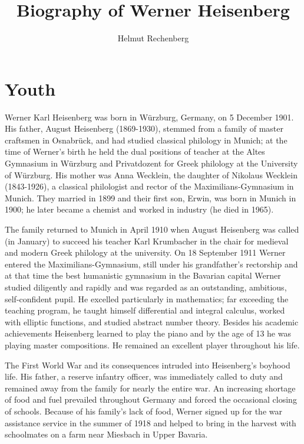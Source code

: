 \documentclass{article}
\title{Biography of Werner Heisenberg}
\author{Helmut Rechenberg}
\date{}
\begin{document}
\maketitle

\tableofcontents

\section{Youth}

Werner Karl Heisenberg was born in Würzburg, Germany, on 5 December 1901. His father, August Heisenberg (1869-1930), stemmed from a family of master craftsmen in Osnabrück, and had studied classical philology in Munich; at the time of Werner's birth he held the dual positions of teacher at the Altes Gymnasium in Würzburg and Privatdozent for Greek philology at the University of Würzburg. His mother was Anna Wecklein, the daughter of Nikolaus Wecklein (1843-1926), a classical philologist and rector of the Maximilians-Gymnasium in Munich. They married in 1899 and their first son, Erwin, was born in Munich in 1900; he later became a chemist and worked in industry (he died in 1965).

The family returned to Munich in April 1910 when August Heisenberg was called (in January) to succeed his teacher Karl Krumbacher in the chair for medieval and modern Greek philology at the university. On 18 September 1911 Werner entered the Maximilians-Gymnasium, still under his grandfather's rectorship and at that time the best humanistic gymnasium in the Bavarian capital Werner studied diligently and rapidly and was regarded as an outstanding, ambitious, self-confident pupil. He excelled particularly in mathematics; far exceeding the teaching program, he taught himself differential and integral calculus, worked with elliptic functions, and studied abstract number theory. Besides his academic achievements Heisenberg learned to play the piano and by the age of 13 he was playing master compositions. He remained an excellent player throughout his life.

The First World War and its consequences intruded into Heisenberg's boyhood life. His father, a reserve infantry officer, was immediately called to duty and remained away from the family for nearly the entire war. An increasing shortage of food and fuel prevailed throughout Germany and forced the occasional closing of schools. Because of his family's lack of food, Werner signed up for the war assistance service in the summer of 1918 and helped to bring in the harvest with schoolmates on a farm near Miesbach in Upper Bavaria.
\end{document}
